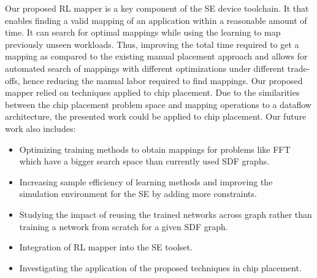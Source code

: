 Our proposed RL mapper is a key component of the SE device toolchain.
It that enables finding a valid mapping of an application within a reasonable amount of time.
It can search for optimal mappings while using the learning to map previously unseen workloads. 
Thus, improving the total time required to get a mapping as compared to the existing manual placement approach and allows for automated search of mappings with different optimizations under different trade-offs, hence reducing the manual labor required to find mappings. 
Our proposed mapper relied on techniques applied to chip placement.
Due to the similarities between the chip placement problem space and mapping operations to a dataflow architecture, the presented work could be applied to chip placement.
Our future work also includes: 
\begin{itemize}
    \item Optimizing training methods to obtain mappings for problems like FFT which have a bigger search space than currently used SDF graphs. 
    \item Increasing sample efficiency of learning methods and improving the simulation environment for the SE by adding more constraints. 
    \item Studying the impact of reusing the trained networks across graph rather than training a network from scratch for a given SDF graph.
    \item Integration of RL mapper into the SE toolset.
    \item Investigating the application of the proposed techniques in chip placement.
\end{itemize}